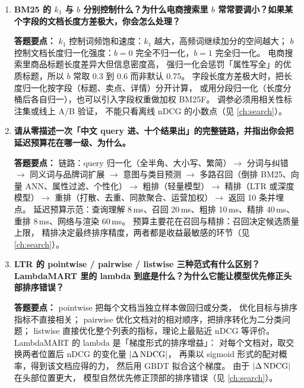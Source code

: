 \begin{interview}[题库与答题要点]

\begin{enumerate}[label=]

  \item[\textcolor{VioletDeep}{\textbf{Q37.}}] \textbf{BM25 的 $k_1$ 与 $b$ 分别控制什么？为什么电商搜索里 $b$ 常常要调小？如果某个字段的文档长度方差极大，你会怎么处理？}
\par\smallskip\noindent\textcolor{VioletDeep}{\textbf{答题要点：}}
$k_1$ 控制词频饱和速度：$k_1$ 越大，高频词继续加分的空间越大；
$b$ 控制文档长度归一化强度：$b=0$ 完全不归一化，$b=1$ 完全归一化。
电商搜索里商品标题长度差异大但信息密度高，
强归一化会惩罚「属性写全」的优质标题，所以 $b$ 常取 0.3 到 0.6 而非默认 0.75。
字段长度方差极大时，把长度归一化按字段（标题、卖点、详情）分开计算，
或用分段归一化（长度分桶后各自归一），也可以引入字段权重做加权 BM25F。
调参必须用相关性标注集或线上 A/B 验证，
不能只看离线 nDCG 的小数点（见 \cref{ch:search}）。

  \item[\textcolor{VioletDeep}{\textbf{Q38.}}] \textbf{请从零描述一次「中文 query 进、十个结果出」的完整链路，并指出你会把延迟预算花在哪一级、为什么。}
\par\smallskip\noindent\textcolor{VioletDeep}{\textbf{答题要点：}}
链路：query 归一化（全半角、大小写、繁简）$\to$ 分词与纠错 $\to$
同义词与品牌词扩展 $\to$ 意图与类目预测 $\to$
多路召回（倒排 BM25、向量 ANN、属性过滤、个性化）$\to$
粗排（轻量模型）$\to$ 精排（LTR 或深度模型）$\to$
重排（打散、去重、同款聚合、运营加权）$\to$ 返回 10 条并埋点。
延迟预算示范：查询理解 8\,ms、召回 20\,ms、粗排 10\,ms、精排 40\,ms、
重排 8\,ms、网络与渲染 60\,ms。
预算主要花在召回与精排：召回决定候选质量上限，
精排决定最终排序精度，两者都是收益最敏感的环节（见 \cref{ch:search}）。

  \item[\textcolor{VioletDeep}{\textbf{Q39.}}] \textbf{LTR 的 pointwise / pairwise / listwise 三种范式有什么区别？LambdaMART 里的 lambda 到底是什么？为什么它能让模型优先修正头部排序错误？}
\par\smallskip\noindent\textcolor{VioletDeep}{\textbf{答题要点：}}
pointwise 把每个文档当独立样本做回归或分类，
优化目标与排序指标不直接相关；
pairwise 优化文档对的相对顺序，把排序转化为二分类问题；
listwise 直接优化整个列表的指标，理论上最贴近 nDCG 等评价。
LambdaMART 的 lambda 是「梯度形式的排序增益」：
对每个文档对，取交换两者位置后 nDCG 的变化量 $\left\lvert \Delta \operatorname{NDCG} \right\rvert$，
再乘以 sigmoid 形式的配对概率，得到该文档应得的力，
然后用 GBDT 拟合这个梯度。
由于 $\left\lvert \Delta \operatorname{NDCG} \right\rvert$ 在头部位置更大，
模型自然优先修正顶部的排序错误（见 \cref{ch:search}）。


\end{enumerate}
\end{interview}
